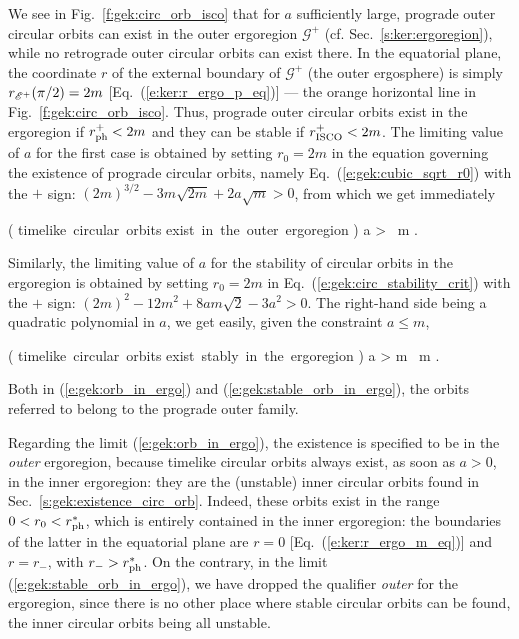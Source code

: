 We see in Fig.~\ref{f:gek:circ_orb_isco} that for $a$ sufficiently large,
prograde outer circular orbits can exist in the outer ergoregion $\mathscr{G}^+$
(cf. Sec.~\ref{s:ker:ergoregion}), while no retrograde outer circular orbits
can exist there.
In the equatorial plane, the coordinate $r$
of the external boundary of $\mathscr{G}^+$
(the outer ergosphere) is
simply $r_{\mathscr{E}^+}(\pi/2) = 2 m$ [Eq.~(\ref{e:ker:r_ergo_p_eq})] --- the orange
horizontal line in Fig.~\ref{f:gek:circ_orb_isco}.
Thus, prograde outer circular orbits exist in the ergoregion if
$r_{\rm ph}^+ < 2 m$ and they can be stable if $r_{\rm ISCO}^+ < 2 m$.
The limiting value of $a$ for the first case is obtained by setting
$r_0 = 2 m$ in the equation governing the existence of prograde circular orbits,
namely Eq.~(\ref{e:gek:cubic_sqrt_r0}) with the $+$ sign:
$(2m)^{3/2} - 3 m \sqrt{2m} + 2 a \sqrt{m} > 0$,
from which we get immediately
\begin{prop}
\be \label{e:gek:orb_in_ergo}
    \left( {\mbox{timelike circular orbits}\atop
     \mbox{exist in the outer ergoregion}} \right)
     \iff a >  \, m .
\ee
\end{prop}
Similarly, the limiting value of $a$ for the stability of
circular orbits in the ergoregion is obtained by setting $r_0 = 2m$ in
Eq.~(\ref{e:gek:circ_stability_crit}) with the $+$ sign:
$(2 m)^2 - 12 m^2 + 8 a m\sqrt{2} - 3 a^2 > 0$.
The right-hand side being a quadratic polynomial in $a$, we get
easily, given the constraint $a \leq m$,
\begin{prop}
\be \label{e:gek:stable_orb_in_ergo}
    \left( {\mbox{timelike circular orbits}\atop
     \mbox{exist stably in the ergoregion}} \right)
     \iff a >  m \, m .
\ee
\end{prop}
Both in (\ref{e:gek:orb_in_ergo}) and (\ref{e:gek:stable_orb_in_ergo}), the
orbits referred to belong to the prograde outer family.

\begin{remark}
Regarding the limit (\ref{e:gek:orb_in_ergo}), the existence is specified to
be in the \emph{outer} ergoregion, because timelike circular orbits always
exist, as soon as $a>0$, in the inner ergoregion: they are the (unstable) inner circular
orbits found in Sec.~\ref{s:gek:existence_circ_orb}. Indeed, these orbits exist
in the range $0 < r_0 < r_{\rm ph}^*$, which is entirely contained in the
inner ergoregion: the boundaries of the latter in the equatorial plane are
$r=0$ [Eq.~(\ref{e:ker:r_ergo_m_eq})] and $r=r_-$, with $r_- > r_{\rm ph}^*$.
On the contrary, in the limit (\ref{e:gek:stable_orb_in_ergo}), we have
dropped the qualifier \emph{outer} for the ergoregion, since there is no other
place where stable circular orbits can be found, the inner circular orbits
being all unstable.
\end{remark}

